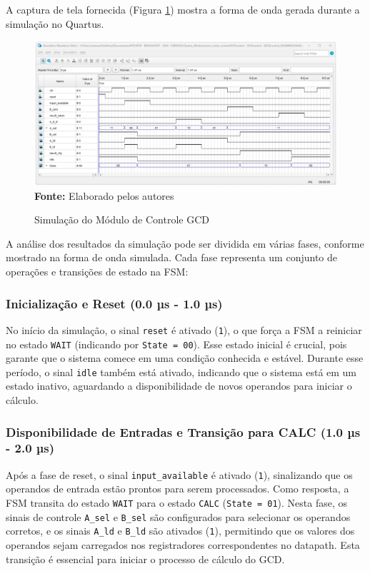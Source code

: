 \documentclass[a4paper,11pt]{article} %
\begin{document}
A captura de tela fornecida (Figura \ref{simlacao_gcd}) mostra a forma de onda gerada durante a simulação no Quartus.

\begin{figure}[ht]
    \centering
    \caption{Simulação do Módulo de Controle GCD}
    \includegraphics[width=15cm,angle=0]{imgs/simulacao_gcd_quartus.png}
    \\\textbf{Fonte:} Elaborado pelos autores
    \label{simlacao_gcd}
\end{figure}

A análise dos resultados da simulação pode ser dividida em várias fases, conforme mostrado na forma de onda simulada. Cada fase representa um conjunto de operações e transições de estado na FSM:

\subsubsection{Inicialização e Reset (0.0 µs - 1.0 µs)}

No início da simulação, o sinal \texttt{reset} é ativado (\texttt{1}), o que força a FSM a reiniciar no estado \texttt{WAIT} (indicando por \texttt{State = 00}). Esse estado inicial é crucial, pois garante que o sistema comece em uma condição conhecida e estável. Durante esse período, o sinal \texttt{idle} também está ativado, indicando que o sistema está em um estado inativo, aguardando a disponibilidade de novos operandos para iniciar o cálculo.

\subsubsection{Disponibilidade de Entradas e Transição para CALC (1.0 µs - 2.0 µs)}

Após a fase de reset, o sinal \texttt{input\_available} é ativado (\texttt{1}), sinalizando que os operandos de entrada estão prontos para serem processados. Como resposta, a FSM transita do estado \texttt{WAIT} para o estado \texttt{CALC} (\texttt{State = 01}). Nesta fase, os sinais de controle \texttt{A\_sel} e \texttt{B\_sel} são configurados para selecionar os operandos corretos, e os sinais \texttt{A\_ld} e \texttt{B\_ld} são ativados (\texttt{1}), permitindo que os valores dos operandos sejam carregados nos registradores correspondentes no datapath. Esta transição é essencial para iniciar o processo de cálculo do GCD.
\end{document}
